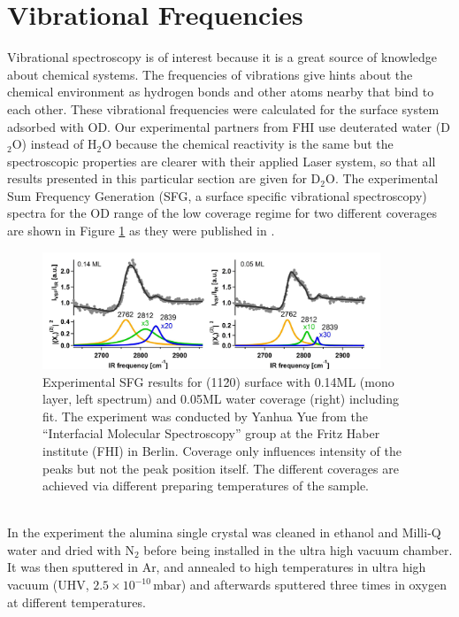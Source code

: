 \documentclass[11pt,DIV=13,BCOR=5mm,a4paper,headinclude]{scrbook}
\begin{document}
\clearpage
\section{Vibrational Frequencies}\label{sec:vib11-20}
Vibrational spectroscopy is of interest because it is a great source of knowledge about chemical systems.
The frequencies of vibrations give hints about the chemical environment as hydrogen bonds and other atoms nearby that bind to each other.
These vibrational frequencies were calculated for the surface system adsorbed with OD.
Our experimental partners from FHI use deuterated water (D$_2$O) instead of H$_2$O because the chemical reactivity is the same but the spectroscopic properties are clearer with their applied Laser system, so that all results presented in this particular section are given for D$_2$O.
The experimental Sum Frequency Generation (SFG, a surface specific vibrational spectroscopy) spectra for the OD range of the low coverage regime for two different coverages are shown in Figure \ref{abb:exp-sfg} as they were published in \cite{Heiden11-20_2018}.
\begin{figure}[!ht]
 \centering
\includegraphics[width=0.9\textwidth]{figures/11-20/SFG_fit.jpg}
 \caption{Experimental SFG results for (11\=20) surface with 0.14ML (mono layer, left spectrum) and 0.05ML water coverage (right) including fit.
The experiment was conducted by Yanhua Yue from the ``Interfacial Molecular Spectroscopy'' group at the Fritz Haber institute (FHI) in Berlin.
Coverage only influences intensity of the peaks but not the peak position itself.
The different coverages are achieved via different preparing temperatures of the sample.}
        \label{abb:exp-sfg}
 \end{figure}
\\
In the experiment the alumina single crystal was cleaned in ethanol and Milli-Q water and dried with N$_2$ before being installed in the ultra high vacuum chamber.
It was then sputtered in Ar, and annealed to high temperatures in ultra high vacuum (UHV, $2.5\times 10^{-10}\,$mbar) and afterwards sputtered three times in oxygen at different temperatures.
\end{document}
